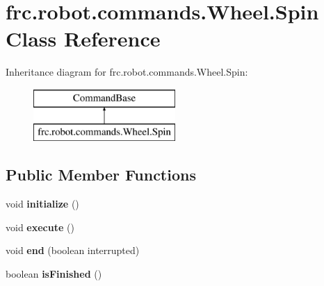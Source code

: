 \hypertarget{classfrc_1_1robot_1_1commands_1_1_wheel_1_1_spin}{}\section{frc.\+robot.\+commands.\+Wheel.\+Spin Class Reference}
\label{classfrc_1_1robot_1_1commands_1_1_wheel_1_1_spin}
Inheritance diagram for frc.\+robot.\+commands.\+Wheel.\+Spin\+:\begin{figure}[H]
\begin{center}
\leavevmode
\includegraphics[height=2.000000cm]{classfrc_1_1robot_1_1commands_1_1_wheel_1_1_spin}
\end{center}
\end{figure}
\subsection*{Public Member Functions}
\begin{DoxyCompactItemize}
\item 
\mbox{\label{classfrc_1_1robot_1_1commands_1_1_wheel_1_1_spin_aa73f8ce730fc0d66030fc1f4fcf1ad55}} 
void {\bfseries initialize} ()
\item 
\mbox{\label{classfrc_1_1robot_1_1commands_1_1_wheel_1_1_spin_a718396980f392b2c94dba407da67c200}} 
void {\bfseries execute} ()
\item 
\mbox{\label{classfrc_1_1robot_1_1commands_1_1_wheel_1_1_spin_a4c4154e78aae5fdfb5d089a46bc8ae9b}} 
void {\bfseries end} (boolean interrupted)
\item 
\mbox{\label{classfrc_1_1robot_1_1commands_1_1_wheel_1_1_spin_aa2d55b2278cb4bcb1f296fe600134fbb}} 
boolean {\bfseries is\+Finished} ()
\end{DoxyCompactItemize}
